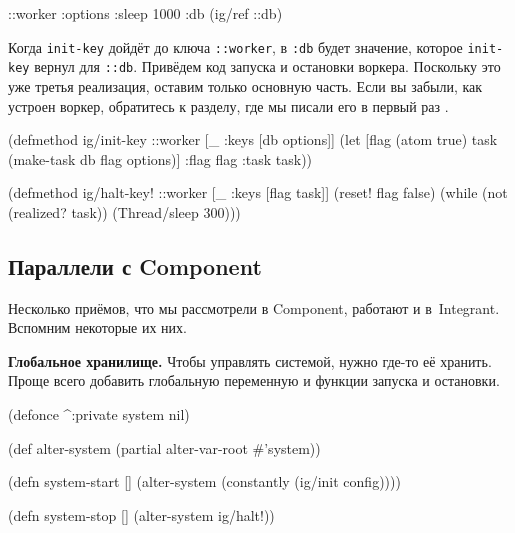 \begin{english}
  \begin{clojure}
{::worker {:options {:sleep 1000}
           :db (ig/ref ::db)}}
  \end{clojure}
\end{english}

Когда \verb|init-key| дойдёт до ключа \verb|::worker|, в \verb|:db| будет
значение, которое \verb|init-key| вернул для \verb|::db|. Привёдем код
запуска и остановки воркера. Поскольку это уже третья реализация, оставим только
основную часть. Если вы забыли, как устроен воркер, обратитесь к разделу, где мы
писали его в первый раз .

\begin{english}
  \begin{clojure}
(defmethod ig/init-key ::worker
  [_ {:keys [db options]}]
  (let [flag (atom true)
        task (make-task db flag options)]
    {:flag flag :task task}))

(defmethod ig/halt-key! ::worker
  [_ {:keys [flag task]}]
  (reset! flag false)
  (while (not (realized? task))
    (Thread/sleep 300)))
  \end{clojure}
\end{english}

\subsection{Параллели с Component}

Несколько приёмов, что мы рассмотрели в Component, работают и
в~Integrant. Вспомним некоторые их них.


\textbf{Глобальное хранилище.} Чтобы управлять системой, нужно где-то её
хранить. Проще всего добавить глобальную переменную и функции запуска и
остановки.

\ifx\DEVICETYPE\MOBILE

\begin{english}
  \begin{clojure}
(defonce ^:private system nil)

(def alter-system
  (partial alter-var-root #'system))

(defn system-start []
  (alter-system
    (constantly (ig/init config))))

(defn system-stop []
  (alter-system ig/halt!))
  \end{clojure}
\end{english}

